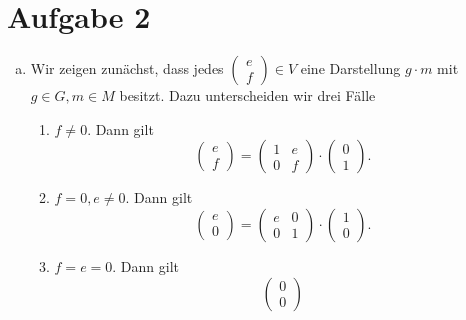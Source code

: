 \documentclass{article}
\begin{document}
\section*{Aufgabe 2}
\begin{enumerate}[(a)]
    \item Wir zeigen zunächst, dass jedes $\begin{pmatrix}
                  e \\f
              \end{pmatrix} \in V$ eine Darstellung $g \cdot m$ mit $g\in G, m \in M$ besitzt.
          Dazu unterscheiden wir drei Fälle
          \begin{enumerate}[(1)]
              \item $f \neq 0$. Dann gilt
                    \[
                        \begin{pmatrix}
                            e \\f
                        \end{pmatrix}  = \begin{pmatrix}
                            1 & e \\
                            0 & f
                        \end{pmatrix} \cdot \begin{pmatrix}
                            0 \\1
                        \end{pmatrix}.
                    \]
              \item $f = 0, e\neq 0$. Dann gilt
                    \[
                        \begin{pmatrix}
                            e \\0
                        \end{pmatrix}  = \begin{pmatrix}
                            e & 0 \\
                            0 & 1
                        \end{pmatrix} \cdot \begin{pmatrix}
                            1 \\0
                        \end{pmatrix}.
                    \]
              \item $f = e = 0$. Dann gilt
                    \[
                        \begin{pmatrix}
                            0 \\0

\end{pmatrix}\]
\end{enumerate}
\end{enumerate}
\end{document}
